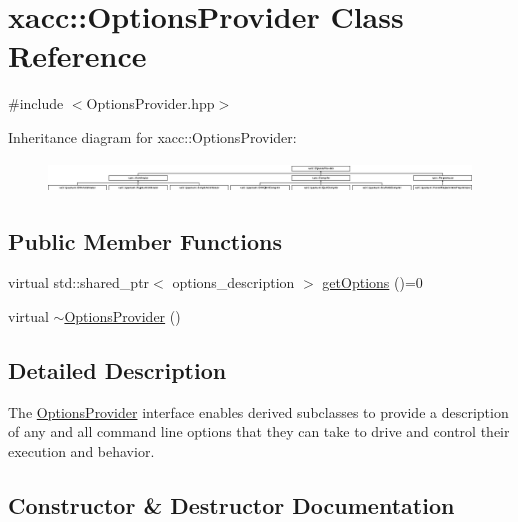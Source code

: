 \hypertarget{a01721}{}\section{xacc\+:\+:Options\+Provider Class Reference}
\label{a01721}


{\ttfamily \#include $<$Options\+Provider.\+hpp$>$}

Inheritance diagram for xacc\+:\+:Options\+Provider\+:\begin{figure}[H]
\begin{center}
\leavevmode
\includegraphics[height=0.824742cm]{a01721}
\end{center}
\end{figure}
\subsection*{Public Member Functions}
\begin{DoxyCompactItemize}
\item 
virtual std\+::shared\+\_\+ptr$<$ options\+\_\+description $>$ \hyperlink{a01721_a6d150954f852109bfe2c1ae90222926f}{get\+Options} ()=0
\item 
virtual \hyperlink{a01721_a7782757b419792ff346f563517eed8b8}{$\sim$\+Options\+Provider} ()
\end{DoxyCompactItemize}


\subsection{Detailed Description}
The \hyperlink{a01721}{Options\+Provider} interface enables derived subclasses to provide a description of any and all command line options that they can take to drive and control their execution and behavior. 

\subsection{Constructor \& Destructor Documentation}
\mbox{\label{a01721_a7782757b419792ff346f563517eed8b8}} 

